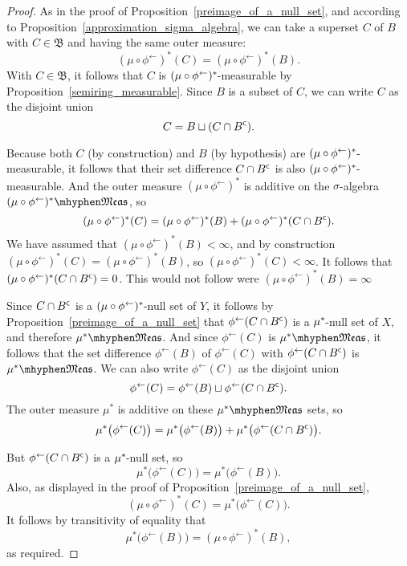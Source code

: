 \documentclass[
twoside=true,
paper=letter,
fontsize=11pt,
pagesize=auto,
leqno,
openany,
headsepline,
overfullrule,
]{scrbook}
\theoremstyle{plain}
\theoremstyle{plain}
\theoremstyle{definition}
\theoremstyle{bfnoteitalic}
\theoremstyle{bfnoteroman}
\newcommand{\sigalg}[1]{\mathfrak{#1}}
\newcommand{\textsigma}{\hbox{\large{$\sigma$}}\kern-1pt}
\newcommand{\comp}{^{\hbox{\tiny{$\mathsf C$}}}}
\newcommand{\preimage}[1]{#1^{\leftarrow}}
\newcommand{\meets}{\cap}
\newcommand{\sigmaalgebraii}{\sigalg{B}}
\newcommand{\measurable}[1]{{#1}\mhyphen\mathfrak{Meas}}
\newcommand{\kernast}{\ast\kern-1pt}
\newcommand{\measurespace}{X}
\newcommand{\measurespaceii}{Y}
\newcommand{\measure}{\mu}
\begin{document}
\begin{proof}
As in the proof of Proposition~\ref{preimage_of_a_null_set}, and according to Proposition~\ref{approximation_sigma_algebra}, we can take a superset $C$ of $B$ with $C\in\sigmaalgebraii$ and having the same outer measure: 
\[
(\measure\circ\preimage{\phi})^*(C) =
(\measure\circ\preimage{\phi})^*(B).
\]
With $C\in\sigmaalgebraii$, it follows that $C$ is $(\measure\circ\preimage{\phi})^\kernast$-measurable by Proposition~\ref{semiring_measurable}.
Since $B$ is a subset of $C$, we can write $C$ as the disjoint union
\[
C=B\sqcup (C\meets B\comp).
\]

Because both $C$ (by construction) and $B$ (by hypothesis) are $(\measure\circ\preimage{\phi})^\kernast$-measurable, it follows that their set difference $C\meets B\comp$ is also $(\measure\circ\preimage{\phi})^\kernast$-measurable. And the outer measure 
$(\measure\circ\preimage{\phi})^*$ is additive on the \textsigma-algebra $\measurable{(\measure\circ\preimage{\phi})^*}$, so
\[
(\measure\circ\preimage{\phi})^*(C) =
(\measure\circ\preimage{\phi})^*(B) +
(\measure\circ\preimage{\phi})^*(C\meets B\comp).
\]
We have assumed that $(\measure\circ\preimage{\phi})^*(B) <\infty$, and by construction 
$(\measure\circ\preimage{\phi})^*(C) =
(\measure\circ\preimage{\phi})^*(B)$, so $(\measure\circ\preimage{\phi})^*(C) <\infty$.
It follows that 
$(\measure\circ\preimage{\phi})^*(C\meets B\comp) =0$. This would not follow were 
$(\measure\circ\preimage{\phi})^*(B) = \infty$

Since $C\meets B\comp$ is a $(\measure\circ\preimage{\phi})^\kernast$-null set of $\measurespaceii$, it follows by Proposition~\ref{preimage_of_a_null_set} that 
$\preimage{\phi}(C\meets B\comp)$ is a $\measure^\kernast$-null set of $\measurespace$, and therefore $\measurable{\measure^*}$. And since $\preimage{\phi}(C)$ is $\measurable{\measure^*}$, it follows that the set difference $\preimage{\phi}(B)$ of $\preimage{\phi}(C)$ with $\preimage{\phi}(C\meets B\comp)$ is $\measurable{\measure^*}$.
We can also write $\preimage{\phi}(C)$ as the disjoint union
\[
\preimage{\phi}(C) =
\preimage{\phi}(B) \sqcup \preimage{\phi}(C\meets B\comp).
\]
The outer measure $\measure^*$ is additive on these $\measurable{\measure^*}$ sets, so
\[
\measure^*\bigl(\preimage{\phi}(C)\bigr) = 
\measure^*\bigl(\preimage{\phi}(B)\bigr) +
\measure^*\bigl(\preimage{\phi}(C\meets B\comp)\bigr).
\]

But $\preimage{\phi}(C\meets B\comp)$ is a $\measure^\kernast$-null set, so 
\[
\measure^*\bigl(\preimage{\phi}(C)\bigr) = 
\measure^*\bigl(\preimage{\phi}(B)\bigr).
\]
Also, as displayed in the proof of Proposition~\ref{preimage_of_a_null_set},
\[
(\measure\circ\preimage{\phi})^*(C)
=
\measure^*\bigl(\preimage{\phi}(C)\bigr).
\] 
It follows by transitivity of equality that 
\[
\measure^*\bigl(\preimage{\phi}(B)\bigr) = (\measure\circ\preimage{\phi})^*(B),
\]
as required.
\end{proof}
\end{document}
